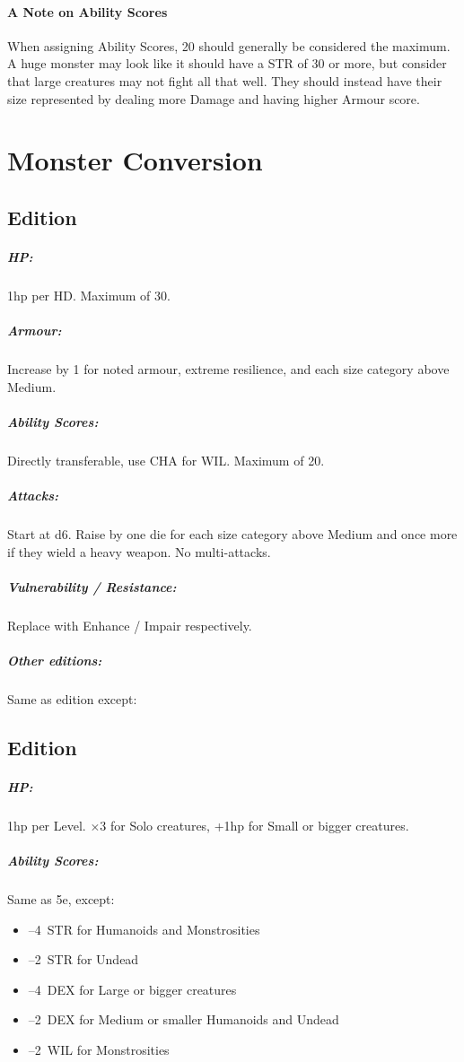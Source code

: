 \documentclass[itdr]{subfiles}
\begin{document}
\vfill
{}
\paragraph{A Note on Ability Scores}
When assigning Ability Scores, 20 should generally be considered the maximum. A huge monster may look like it should have a STR of 30 or more, but consider that large creatures may not fight all that well. They should instead have their size represented by dealing more Damage and having higher Armour score.

\vfill
\break

\section{Monster Conversion}

\subsection*{ Edition}

\subparagraph{HP:} 1hp per HD. Maximum of 30.
\subparagraph{Armour:} Increase by 1 for noted armour, extreme resilience, and each size category above Medium.
\subparagraph{Ability Scores:} Directly transferable, use CHA for WIL. Maximum of 20.
\subparagraph{Attacks:} Start at d6. Raise by one die for each size category above Medium and once more if they wield a heavy weapon. No multi-attacks.
\subparagraph{Vulnerability / Resistance:} Replace with Enhance / Impair respectively.

\vfill

\subparagraph{Other editions:} Same as  edition except:
\subsection*{ Edition}
\subparagraph{HP:} 1hp per Level. $\times$3 for Solo creatures, +1hp for Small or bigger creatures.
\subparagraph{Ability Scores:} Same as 5e, except:
\begin{itemize}
	\item --4~STR for Humanoids and Monstrosities
	\item --2~STR for Undead
	\item --4~DEX for Large or bigger creatures
	\item --2~DEX for Medium or smaller Humanoids and Undead
	\item --2~WIL for Monstrosities
\end{itemize}
\end{document}
